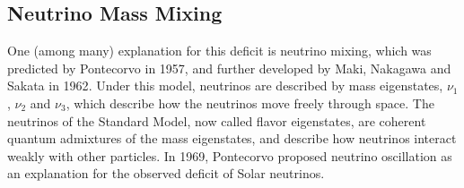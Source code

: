 \documentclass[/main.tex]{subfiles}
\begin{document}
\subsection{Neutrino Mass Mixing}
One (among many) explanation for this deficit is neutrino mixing, which was predicted by Pontecorvo in 1957\cite{Pontecorvo1957}, and further developed by Maki, Nakagawa and Sakata in 1962\cite{Maki1962}.
Under this model, neutrinos are described by mass eigenstates, $\nu_1$, $\nu_2$ and $\nu_3$, which describe how the neutrinos move freely through space.
The neutrinos of the Standard Model, now called flavor eigenstates, are coherent quantum admixtures of the mass eigenstates, and describe how neutrinos interact weakly with other particles.
In 1969, Pontecorvo proposed neutrino oscillation as an explanation for the observed deficit of Solar neutrinos\cite{Pontecorvo1969}.
\end{document}
